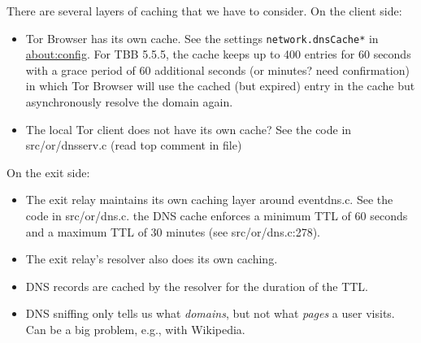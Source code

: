 There are several layers of caching that we have to consider.  On the client
side:
\begin{itemize}
	\item Tor Browser has its own cache.  See the settings
		\texttt{network.dnsCache*} in \url{about:config}. For TBB 5.5.5, the
		cache keeps up to 400 entries for 60 seconds with a grace period of
		60 additional seconds (or minutes? need confirmation) in which Tor
		Browser will use the cached (but expired) entry in the cache but
		asynchronously resolve the domain again.
	\item The local Tor client does not have its own cache?  See the
		code in src/or/dnsserv.c (read top comment in file)
\end{itemize}

On the exit side:
\begin{itemize}
	\item The exit relay maintains its own caching layer around eventdns.c.
	See the code in src/or/dns.c. the DNS cache enforces a minimum TTL of
	60 seconds and a maximum TTL of 30 minutes (see src/or/dns.c:278).
	\item The exit relay's resolver also does its own caching.
	\item DNS records are cached by the resolver for the duration of the TTL.
	\item DNS sniffing only tells us what \emph{domains}, but not what
		\emph{pages} a user visits.  Can be a big problem, e.g., with Wikipedia.
\end{itemize}
